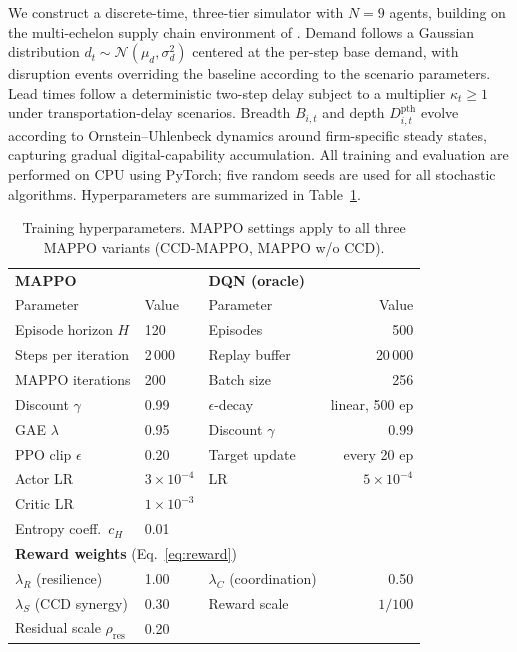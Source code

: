 \documentclass[11pt,a4paper]{article}
\theoremstyle{plain}
\theoremstyle{definition}
\begin{document}
We construct a discrete-time, three-tier simulator with $N=9$ agents, building on the
multi-echelon supply chain environment of \citet{oroojlooyjadid2022deep}.  Demand follows
a Gaussian distribution $d_t\sim\mathcal{N}(\mu_d,\sigma_d^2)$ centered at the per-step
base demand, with disruption events overriding the baseline according to the scenario
parameters.  Lead times follow a deterministic two-step delay subject to a multiplier
$\kappa_t\ge1$ under transportation-delay scenarios.  Breadth $B_{i,t}$ and depth
$D^{\mathrm{pth}}_{i,t}$ evolve according to Ornstein--Uhlenbeck dynamics around
firm-specific steady states, capturing gradual digital-capability accumulation.  All
training and evaluation are performed on CPU using PyTorch; five random seeds are used
for all stochastic algorithms.  Hyperparameters are summarized in Table~\ref{tab:hyper}.

\begin{table}[t]
\centering
\caption{Training hyperparameters.  MAPPO settings apply to all three MAPPO variants
(CCD-MAPPO, MAPPO w/o CCD).}
\label{tab:hyper}
\begin{tabular}{lllr}
\toprule
\multicolumn{2}{l}{\textbf{MAPPO}} & \multicolumn{2}{l}{\textbf{DQN (oracle)}} \\
Parameter & Value & Parameter & Value \\
\midrule
Episode horizon $H$ & 120 & Episodes & 500 \\
Steps per iteration & 2\,000 & Replay buffer & 20\,000 \\
MAPPO iterations & 200 & Batch size & 256 \\
Discount $\gamma$ & 0.99 & $\epsilon$-decay & linear, 500 ep \\
GAE $\lambda$ & 0.95 & Discount $\gamma$ & 0.99 \\
PPO clip $\epsilon$ & 0.20 & Target update & every 20 ep \\
Actor LR & $3\times10^{-4}$ & LR & $5\times10^{-4}$ \\
Critic LR & $1\times10^{-3}$ & & \\
Entropy coeff.\ $c_H$ & 0.01 & & \\
\midrule
\multicolumn{4}{l}{\textbf{Reward weights} (Eq.~\eqref{eq:reward})} \\
$\lambda_R$ (resilience) & 1.00 & $\lambda_C$ (coordination) & 0.50 \\
$\lambda_S$ (CCD synergy) & 0.30 & Reward scale & $1/100$ \\
Residual scale $\rho_{\mathrm{res}}$ & 0.20 & & \\
\bottomrule
\end{tabular}
\end{table}
\end{document}
